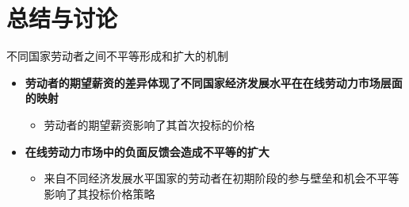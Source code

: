 \documentclass{beamer}
\begin{document}
    \section{总结与讨论}
    
        \begin{frame}{不同国家劳动者之间不平等形成和扩大的机制}{\secname}

        \begin{itemize}
            \item \textbf{劳动者的期望薪资的差异体现了不同国家经济发展水平在在线劳动力市场层面的映射}
            \begin{itemize}
                \item 劳动者的期望薪资影响了其首次投标的价格
            \end{itemize}
            \pause
            \item \textbf{在线劳动力市场中的负面反馈会造成不平等的扩大}
            \begin{itemize}
                \item 来自不同经济发展水平国家的劳动者在初期阶段的参与壁垒和机会不平等影响了其投标价格策略
            \end{itemize}
        \end{itemize}

       \end{frame}




    \QApage
\end{document}
